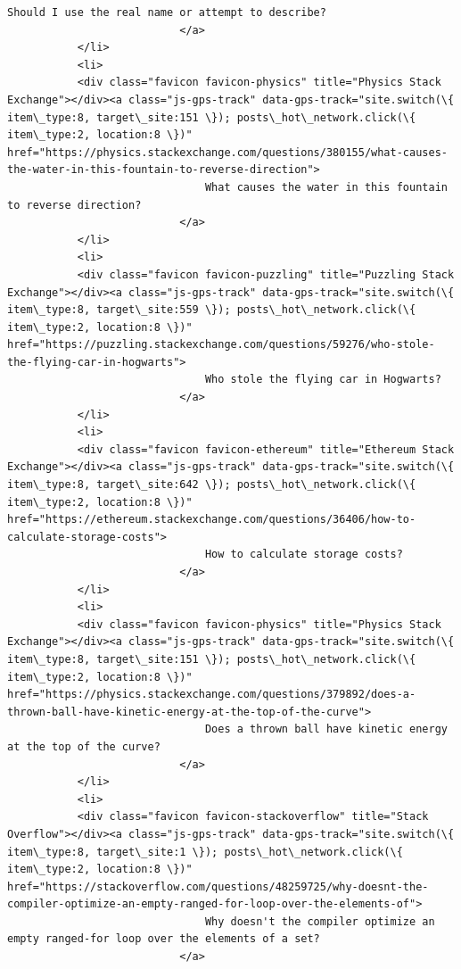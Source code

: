 \documentclass[11pt]{article}
\begin{document}
\begin{Verbatim}[commandchars=\\\{\}]
                               Should I use the real name or attempt to describe?
                           </a>
           </li>
           <li>
           <div class="favicon favicon-physics" title="Physics Stack Exchange"></div><a class="js-gps-track" data-gps-track="site.switch(\{ item\_type:8, target\_site:151 \}); posts\_hot\_network.click(\{ item\_type:2, location:8 \})" href="https://physics.stackexchange.com/questions/380155/what-causes-the-water-in-this-fountain-to-reverse-direction">
                               What causes the water in this fountain to reverse direction?
                           </a>
           </li>
           <li>
           <div class="favicon favicon-puzzling" title="Puzzling Stack Exchange"></div><a class="js-gps-track" data-gps-track="site.switch(\{ item\_type:8, target\_site:559 \}); posts\_hot\_network.click(\{ item\_type:2, location:8 \})" href="https://puzzling.stackexchange.com/questions/59276/who-stole-the-flying-car-in-hogwarts">
                               Who stole the flying car in Hogwarts?
                           </a>
           </li>
           <li>
           <div class="favicon favicon-ethereum" title="Ethereum Stack Exchange"></div><a class="js-gps-track" data-gps-track="site.switch(\{ item\_type:8, target\_site:642 \}); posts\_hot\_network.click(\{ item\_type:2, location:8 \})" href="https://ethereum.stackexchange.com/questions/36406/how-to-calculate-storage-costs">
                               How to calculate storage costs?
                           </a>
           </li>
           <li>
           <div class="favicon favicon-physics" title="Physics Stack Exchange"></div><a class="js-gps-track" data-gps-track="site.switch(\{ item\_type:8, target\_site:151 \}); posts\_hot\_network.click(\{ item\_type:2, location:8 \})" href="https://physics.stackexchange.com/questions/379892/does-a-thrown-ball-have-kinetic-energy-at-the-top-of-the-curve">
                               Does a thrown ball have kinetic energy at the top of the curve?
                           </a>
           </li>
           <li>
           <div class="favicon favicon-stackoverflow" title="Stack Overflow"></div><a class="js-gps-track" data-gps-track="site.switch(\{ item\_type:8, target\_site:1 \}); posts\_hot\_network.click(\{ item\_type:2, location:8 \})" href="https://stackoverflow.com/questions/48259725/why-doesnt-the-compiler-optimize-an-empty-ranged-for-loop-over-the-elements-of">
                               Why doesn't the compiler optimize an empty ranged-for loop over the elements of a set?
                           </a>

\end{Verbatim}
\end{document}
